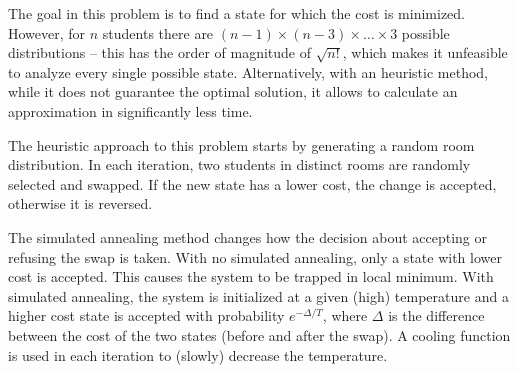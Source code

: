 The goal in this problem is to find a state for which the cost is minimized. However, for $n$ students there are $(n-1)\times (n-3)\times\ldots\times 3$ possible distributions -- this has the order of magnitude of $\sqrt{n!}$, which makes it unfeasible to analyze every single possible state. Alternatively, with an heuristic method, while it does not guarantee the optimal solution, it allows to calculate an approximation in significantly less time.

The heuristic approach to this problem starts by generating a random room distribution. In each iteration, two students in distinct rooms are randomly selected and swapped. If the new state has a lower cost, the change is accepted, otherwise it is reversed.

The simulated annealing method changes how the decision about accepting or refusing the swap is taken. With no simulated annealing, only a state with lower cost is accepted. This causes the system to be trapped in local minimum. With simulated annealing, the system is initialized at a given (high) temperature and a higher cost state is accepted with probability $e^{-\Delta/T}$, where $\Delta$ is the difference between the cost of the two states (before and after the swap). A cooling function is used in each iteration to (slowly) decrease the temperature.